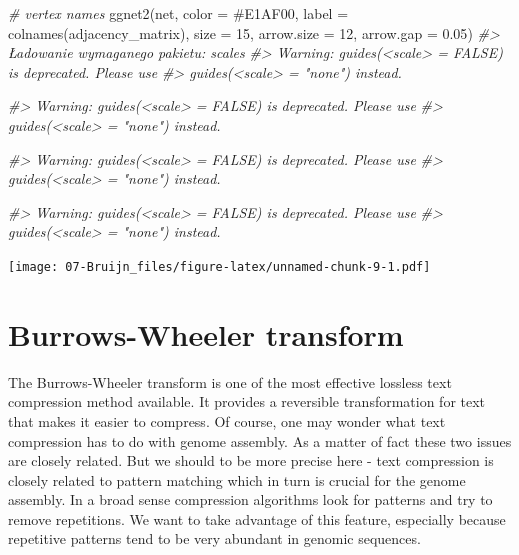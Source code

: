 \documentclass[
]{book}
\newenvironment{Shaded}{\begin{snugshade}}{\end{snugshade}}
\newcommand{\AttributeTok}[1]{\textcolor[rgb]{0.77,0.63,0.00}{#1}}
\newcommand{\CommentTok}[1]{\textcolor[rgb]{0.56,0.35,0.01}{\textit{#1}}}
\newcommand{\DecValTok}[1]{\textcolor[rgb]{0.00,0.00,0.81}{#1}}
\newcommand{\FloatTok}[1]{\textcolor[rgb]{0.00,0.00,0.81}{#1}}
\newcommand{\FunctionTok}[1]{\textcolor[rgb]{0.00,0.00,0.00}{#1}}
\newcommand{\NormalTok}[1]{#1}
\newcommand{\StringTok}[1]{\textcolor[rgb]{0.31,0.60,0.02}{#1}}
\begin{document}
\begin{Shaded}
\begin{Highlighting}[]
\CommentTok{\# vertex names}
\FunctionTok{ggnet2}\NormalTok{(net, }\AttributeTok{color =} \StringTok{\textquotesingle{}\#E1AF00\textquotesingle{}}\NormalTok{, }\AttributeTok{label =} \FunctionTok{colnames}\NormalTok{(adjacency\_matrix), }\AttributeTok{size =} \DecValTok{15}\NormalTok{, }\AttributeTok{arrow.size =} \DecValTok{12}\NormalTok{, }\AttributeTok{arrow.gap =} \FloatTok{0.05}\NormalTok{)}
\CommentTok{\#\textgreater{} Ładowanie wymaganego pakietu: scales}
\CommentTok{\#\textgreater{} Warning: \textasciigrave{}guides(\textless{}scale\textgreater{} = FALSE)\textasciigrave{} is deprecated. Please use}
\CommentTok{\#\textgreater{} \textasciigrave{}guides(\textless{}scale\textgreater{} = "none")\textasciigrave{} instead.}

\CommentTok{\#\textgreater{} Warning: \textasciigrave{}guides(\textless{}scale\textgreater{} = FALSE)\textasciigrave{} is deprecated. Please use}
\CommentTok{\#\textgreater{} \textasciigrave{}guides(\textless{}scale\textgreater{} = "none")\textasciigrave{} instead.}

\CommentTok{\#\textgreater{} Warning: \textasciigrave{}guides(\textless{}scale\textgreater{} = FALSE)\textasciigrave{} is deprecated. Please use}
\CommentTok{\#\textgreater{} \textasciigrave{}guides(\textless{}scale\textgreater{} = "none")\textasciigrave{} instead.}

\CommentTok{\#\textgreater{} Warning: \textasciigrave{}guides(\textless{}scale\textgreater{} = FALSE)\textasciigrave{} is deprecated. Please use}
\CommentTok{\#\textgreater{} \textasciigrave{}guides(\textless{}scale\textgreater{} = "none")\textasciigrave{} instead.}
\end{Highlighting}
\end{Shaded}

\texttt{[image: 07-Bruijn\_files/figure-latex/unnamed-chunk-9-1.pdf]}

\hypertarget{bwt}{%
\chapter{Burrows-Wheeler transform}\label{bwt}}

The Burrows-Wheeler transform is one of the most effective lossless text compression method available. It provides a reversible transformation for text that makes it easier to compress. Of course, one may wonder what text compression has to do with genome assembly. As a matter of fact these two issues are closely related. But we should to be more precise here - text compression is closely related to pattern matching which in turn is crucial for the genome assembly. In a broad sense compression algorithms look for patterns and try to remove repetitions. We want to take advantage of this feature, especially because repetitive patterns tend to be very abundant in genomic sequences.
\end{document}
